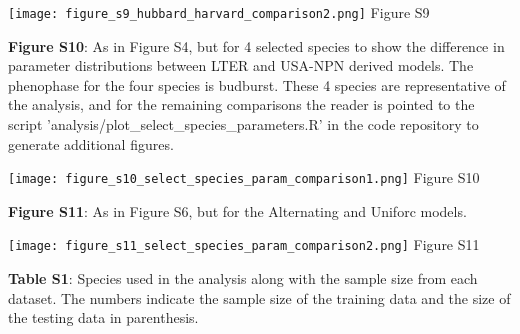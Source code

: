 \documentclass[a4paper,12pt]{article}
\begin{document}
\newpage

\begin{center}
	\centering
		\texttt{[image: figure\_s9\_hubbard\_harvard\_comparison2.png]}
	Figure S9
\end{center}

\newpage

\textbf{Figure S10}: As in Figure S4, but for 4 selected species to show the difference in parameter distributions between LTER and USA-NPN derived models. The phenophase for the four species is budburst. These 4 species are representative of the analysis, and for the remaining comparisons the reader is pointed to the script 'analysis/plot\_select\_species\_parameters.R' in the code repository to generate additional figures.

\newpage

\begin{center}
	\centering
		\texttt{[image: figure\_s10\_select\_species\_param\_comparison1.png]}
	Figure S10
\end{center}

\newpage

\textbf{Figure S11}: As in Figure S6, but for the Alternating and Uniforc models. 

\newpage

\begin{center}
	\centering
		\texttt{[image: figure\_s11\_select\_species\_param\_comparison2.png]}
	Figure S11
\end{center}
\newpage

\textbf{Table S1}: Species used in the analysis along with the sample size from each dataset. The numbers indicate the sample size of the training data and the size of the testing data in parenthesis. 

\newpage
\end{document}
